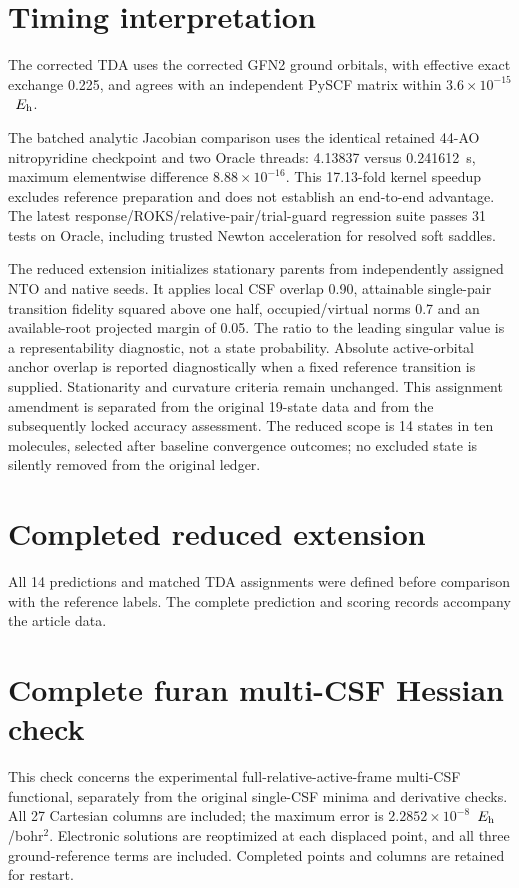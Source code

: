 \documentclass[11pt,a4paper]{article}
\newcommand{\Eh}{\ensuremath{E_{\rm h}}}
\begin{document}
\section{Timing interpretation}
The corrected TDA uses the corrected GFN2 ground orbitals, with effective exact exchange 0.225, and agrees with an independent PySCF matrix within $3.6\times10^{-15}$~\Eh.

The batched analytic Jacobian comparison uses the identical retained 44-AO nitropyridine checkpoint and two Oracle threads: 4.13837 versus 0.241612~s, maximum elementwise difference $8.88\times10^{-16}$. This 17.13-fold kernel speedup excludes reference preparation and does not establish an end-to-end advantage. The latest response/ROKS/relative-pair/trial-guard regression suite passes 31 tests on Oracle, including trusted Newton acceleration for resolved soft saddles.

The reduced extension initializes stationary parents from independently assigned NTO and native seeds. It applies local CSF overlap 0.90, attainable single-pair transition fidelity squared above one half, occupied/virtual norms 0.7 and an available-root projected margin of 0.05. The ratio to the leading singular value is a representability diagnostic, not a state probability. Absolute active-orbital anchor overlap is reported diagnostically when a fixed reference transition is supplied. Stationarity and curvature criteria remain unchanged. This assignment amendment is separated from the original 19-state data and from the subsequently locked accuracy assessment. The reduced scope is 14 states in ten molecules, selected after baseline convergence outcomes; no excluded state is silently removed from the original ledger.

\section{Completed reduced extension}
All 14 predictions and matched TDA assignments were defined before comparison with the reference labels. The complete prediction and scoring records accompany the article data.


\section{Complete furan multi-CSF Hessian check}
This check concerns the experimental full-relative-active-frame multi-CSF functional, separately from the original single-CSF minima and derivative checks. All 27 Cartesian columns are included; the maximum error is $2.2852\times10^{-8}$~\Eh/bohr$^2$. Electronic solutions are reoptimized at each displaced point, and all three ground-reference terms are included. Completed points and columns are retained for restart.

\end{document}
